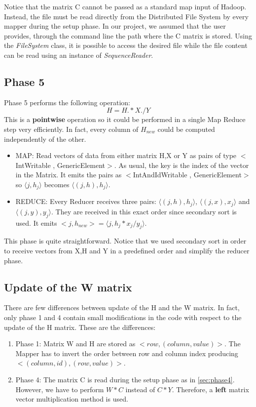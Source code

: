 \documentclass[a4paper,12pt]{article}
\newcommand{\CLASS}[1] {\textit{#1}}
\begin{document}
Notice that the matrix C cannot be passed as a standard map input of Hadoop.
Instead, the file must be read directly from the Distributed File System by every mapper during the setup phase. 
In our project, we assumed that the user provides, through the command line the path where the C matrix is stored. 
Using the \CLASS{FileSystem} class, it is possible to access the desired file while the file content can be read using an instance of \CLASS{SequenceReader}.

\subsection{Phase 5}
\label{sec:phase5}

Phase 5 performs the following operation:
$$ H = H.*X./Y$$
This is a \textbf{pointwise} operation so it could be performed in a single Map Reduce step very efficiently.
In fact, every column of $H_{new}$ could be computed independently of the other.
\begin{itemize}

         \item MAP: Read vectors of data from either matrix H,X or Y as pairs of type $<$IntWritable , GenericElement$>$.
         As usual, the key is the index of the vector in the Matrix.
         It emits the pairs as $<$IntAndIdWritable , GenericElement$>$ so $\langle j, h_j \rangle$ becomes $\langle (j,h), h_j \rangle$.

          \item REDUCE: Every Reducer receives three pairs: $\langle (j,h), h_j \rangle$, $\langle (j,x), x_j \rangle$ and $\langle (j,y), y_j \rangle$. They are received in this exact order since secondary sort is used. It emits $<j,h_{new}> = \langle j, h_j*x_j/y_j \rangle$.

\end{itemize}

This phase is quite straightforward.
Notice that we used secondary sort in order to receive vectors from X,H and Y in a predefined order and simplify the reducer phase.

\subsection{Update of the W matrix}
\label{sec:Wphase}

There are few differences between update of the H and the W matrix.
In fact, only phase 1 and 4 contain small modifications in the code with respect to the update of the H matrix.
These are the differences:
\begin{enumerate}
\item Phase 1: Matrix W and H are stored as $<row, (column,value)>$. 
The Mapper has to invert the order between row and column index producing $<(column,id),(row,value)>$.
\item Phase 4: The matrix C is read during the setup phase as in \ref{sec:phase4}. 
However, we have to perform $W*C$ instead of $C*Y$.
Therefore, a \textbf{left} matrix vector multiplication method is used.
\end{enumerate}
\end{document}
